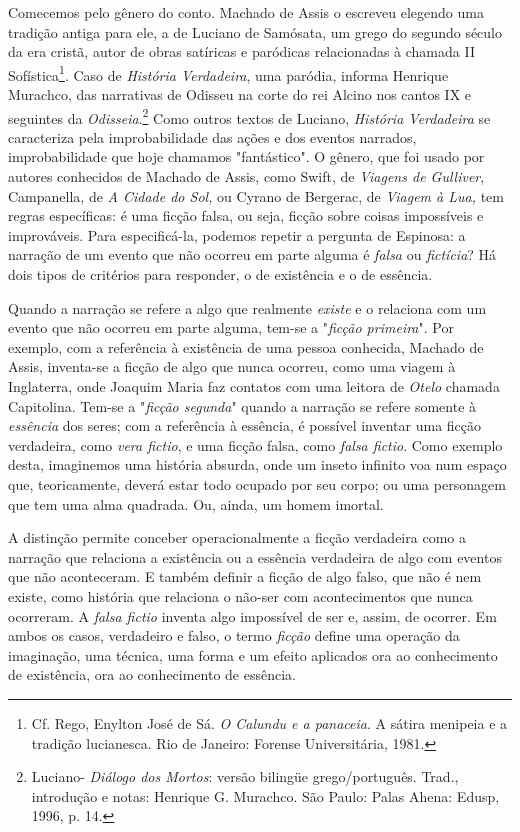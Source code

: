 Comecemos pelo gênero do conto. Machado de Assis o escreveu elegendo uma
tradição antiga para ele, a de Luciano de Samósata, um grego do segundo
século da era cristã, autor de obras satíricas e paródicas relacionadas
à chamada II Sofística\footnote{Cf. Rego, Enylton José de Sá. \emph{O
  Calundu e a panaceia}. A sátira menipeia e a tradição lucianesca. Rio
  de Janeiro: Forense Universitária, 1981.}. Caso de \emph{História
Verdadeira}, uma paródia, informa Henrique Murachco, das narrativas de
Odisseu na corte do rei Alcino nos cantos IX e seguintes da
\emph{Odisseia}.\footnote{Luciano- \emph{Diálogo dos Mortos}: versão
  bilingüe grego/português. Trad., introdução e notas: Henrique G.
  Murachco. São Paulo: Palas Ahena: Edusp, 1996, p. 14.} Como outros
textos de Luciano, \emph{História Verdadeira} se caracteriza pela
improbabilidade das ações e dos eventos narrados, improbabilidade que
hoje chamamos "fantástico". O gênero, que foi usado por autores
conhecidos de Machado de Assis, como Swift, de \emph{Viagens de
Gulliver}, Campanella, de \emph{A Cidade do Sol,} ou Cyrano de Bergerac,
de \emph{Viagem à Lua,} tem regras específicas: é uma ficção falsa, ou
seja, ficção sobre coisas impossíveis e improváveis. Para especificá-la,
podemos repetir a pergunta de Espinosa: a narração de um evento que não
ocorreu em parte alguma é \emph{falsa} ou \emph{fictícia}? Há dois tipos
de critérios para responder, o de existência e o de essência.

Quando a narração se refere a algo que realmente \emph{existe} e o
relaciona com um evento que não ocorreu em parte alguma, tem-se a
"\emph{ficção primeira}". Por exemplo, com a referência à existência de
uma pessoa conhecida, Machado de Assis, inventa-se a ficção de algo que
nunca ocorreu, como uma viagem à Inglaterra, onde Joaquim Maria faz
contatos com uma leitora de \emph{Otelo} chamada Capitolina. Tem-se a
"\emph{ficção segunda}" quando a narração se refere somente à
\emph{essência} dos seres; com a referência à essência, é possível
inventar uma ficção verdadeira, como \emph{vera fictio}, e uma ficção
falsa, como \emph{falsa fictio}. Como exemplo desta, imaginemos uma
história absurda, onde um inseto infinito voa num espaço que,
teoricamente, deverá estar todo ocupado por seu corpo; ou uma personagem
que tem uma alma quadrada. Ou, ainda, um homem imortal.

A distinção permite conceber operacionalmente a ficção verdadeira como a
narração que relaciona a existência ou a essência verdadeira de algo com
eventos que não aconteceram. E também definir a ficção de algo falso,
que não é nem existe, como história que relaciona o não-ser com
acontecimentos que nunca ocorreram. A \emph{falsa fictio} inventa algo
impossível de ser e, assim, de ocorrer. Em ambos os casos, verdadeiro e
falso, o termo \emph{ficção} define uma operação da imaginação, uma
técnica, uma forma e um efeito aplicados ora ao conhecimento de
existência, ora ao conhecimento de essência.

